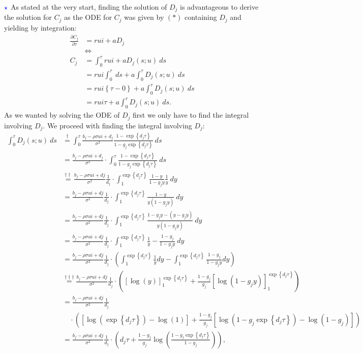\documentclass[12pt]{article}
\numberwithin{equation}{section}
\newcommand{\lc}{\left\{}
\newcommand{\rc}{\right\}}
\begin{document}
$\textcolor{blue}{\star}$  As stated at the very start, finding the solution of
$D_j$ is advantageous to derive the solution for $C_j$ as the ODE for $C_j$ was
given by $(*)$ containing $D_j$ and yielding by integration:
\begin{align*}
    \frac{\partial C_j}{\partial \tau}&=rui+aD_j\\
    &\iff\\
    C_j&=\int_0^\tau rui+aD_j(s;u)\:ds\\
    &=rui\int_0^\tau \:ds+a\int_0^\tau D_j(s;u)\:ds\\
    &=rui\lc \tau-0\rc+a\int_0^\tau D_j(s;u)\:ds\\
    &=rui\tau+a\int_0^\tau D_j(s;u)\:ds.
\end{align*}
As we wanted by solving the ODE of $D_j$ first we only have to find the integral
involving $D_j$. We proceed with finding the integral involving $D_j$:
\begin{align*}
    \int_0^\tau D_j(s;u)\:ds&\overset{\dagger}{=}\int_0^\tau \frac{b_j-\rho \sigma u i + d_j}{\sigma^2} \frac{1-\exp\left\{d_j \tau\right\}}{1-g_j \exp\left\{d_j \tau\right\}} \:ds\\
    &= \frac{b_j-\rho \sigma u i + d_j}{\sigma^2}\cdot \int_0^\tau\frac{1-\exp\left\{d_j \tau\right\}}{1-g_j \exp\left\{d_j \tau\right\}} \:ds\\
    &\overset{\dagger\dagger}{=}\frac{b_j-\rho \sigma u i+d j}{\sigma^2} \frac{1}{d_j} \cdot\int_{1}^{\exp\left\{d_j \tau\right\}} \frac{1-y}{1-g_j y} \frac{1}{y} \:dy \\
    & =\frac{b_j-\rho \sigma u i+d j}{\sigma^2} \frac{1}{d_j} \cdot\int_{1}^{\exp\left\{d_j \tau\right\}} \frac{1-y}{y\left(1-g_j y\right)} \:dy \\
    & =\frac{b_j-\rho \sigma u i+d j}{\sigma^2} \frac{1}{d_j}\cdot \int_{1}^{\exp\left\{d_j \tau\right\}} \frac{1-g_j y-\left(y-g_j y\right)}{y\left(1-g_j y\right)} \:dy \\
    & =\frac{b_j-\rho \sigma u i+d j}{\sigma^2} \frac{1}{d_j} \cdot\int_{1}^{\exp\left\{d_j \tau\right\}} \frac{1}{y}-\frac{1-g_j}{1-g_j y} \:dy \\
    & =\frac{b_j-\rho \sigma u i+d j}{\sigma^2} \frac{1}{d_j}\cdot\left(\int_{1}^{\exp\left\{d_j \tau\right\}} \frac{1}{y} d y-\int_{1}^{\exp\left\{d_j \tau\right\}} \frac{1-g_j}{1-g_j y} d y\right)\\
    &\overset{\dagger\dagger\dagger}{=}\frac{b_j-\rho \sigma u i+d j}{\sigma^2} \frac{1}{d_j}\cdot \left ( \left [ \log{(y)}\right ]_1^{\exp\left\{d_j \tau\right\}}+\frac{1-g_j}{g_j} \left [ \log{(1-g_jy)}\right ]_1^{\exp\left\{d_j \tau\right\}}\right )\\
    & =\frac{b_j-\rho \sigma u i+d j}{\sigma^2} \frac{1}{d_j}\\&\quad \cdot \left(\left[\log \left(\exp\left\{d_j \tau\right\} \right)-\log{(1)}\right]+\frac{1-g_j}{g_j}\left[\log \left(1-g_j \exp\left\{d_j \tau\right\}\right)-\log \left(1-g_j \right)\right]\right) \\
    &=\frac{b_j-\rho \sigma u i+d j}{\sigma^2} \frac{1}{d_j}\cdot\left(d_j \tau+\frac{1-g_j}{g_j} \log \left(\frac{1-g_j \exp\left\{d_j \tau\right\}}{1-g_j}\right)\right),
\end{align*}
\end{document}
